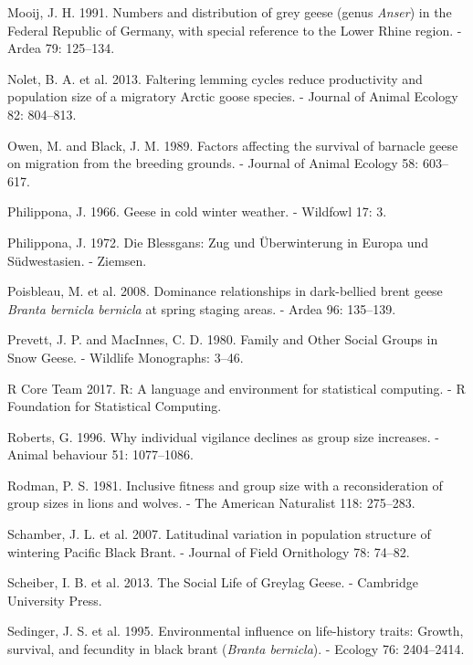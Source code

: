 \documentclass[10pt,twocolumn]{paper}
\begin{document}
\hypertarget{ref-mooij1991numbers}{}
Mooij, J. H. 1991. Numbers and distribution of grey geese (genus
\emph{Anser}) in the Federal Republic of Germany, with special reference
to the Lower Rhine region. - Ardea 79: 125--134.

\hypertarget{ref-nolet2013faltering}{}
Nolet, B. A. et al. 2013. Faltering lemming cycles reduce productivity
and population size of a migratory Arctic goose species. - Journal of
Animal Ecology 82: 804--813.

\hypertarget{ref-owen1989survival}{}
Owen, M. and Black, J. M. 1989. Factors affecting the survival of
barnacle geese on migration from the breeding grounds. - Journal of
Animal Ecology 58: 603--617.

\hypertarget{ref-philippona1966geese}{}
Philippona, J. 1966. Geese in cold winter weather. - Wildfowl 17: 3.

\hypertarget{ref-philippona1972blessgans}{}
Philippona, J. 1972. Die Blessgans: Zug und Überwinterung in Europa und
Südwestasien. - Ziemsen.

\hypertarget{ref-poisbleau2008dominance}{}
Poisbleau, M. et al. 2008. Dominance relationships in dark-bellied brent
geese \emph{Branta bernicla bernicla} at spring staging areas. - Ardea
96: 135--139.

\hypertarget{ref-prevett1980snow}{}
Prevett, J. P. and MacInnes, C. D. 1980. Family and Other Social Groups
in Snow Geese. - Wildlife Monographs: 3--46.

\hypertarget{ref-R}{}
R Core Team 2017. R: A language and environment for statistical
computing. - R Foundation for Statistical Computing.

\hypertarget{ref-roberts1996individual}{}
Roberts, G. 1996. Why individual vigilance declines as group size
increases. - Animal behaviour 51: 1077--1086.

\hypertarget{ref-rodman1981lions}{}
Rodman, P. S. 1981. Inclusive fitness and group size with a
reconsideration of group sizes in lions and wolves. - The American
Naturalist 118: 275--283.

\hypertarget{ref-JOFO:JOFO087}{}
Schamber, J. L. et al. 2007. Latitudinal variation in population
structure of wintering Pacific Black Brant. - Journal of Field
Ornithology 78: 74--82.

\hypertarget{ref-scheiber2013social}{}
Scheiber, I. B. et al. 2013. The Social Life of Greylag Geese. -
Cambridge University Press.

\hypertarget{ref-ECY:ECY19957682404}{}
Sedinger, J. S. et al. 1995. Environmental influence on life-history
traits: Growth, survival, and fecundity in black brant (\emph{Branta
bernicla}). - Ecology 76: 2404--2414.
\end{document}
